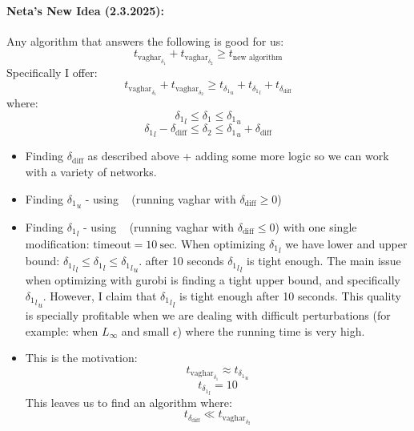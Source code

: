 \documentclass[11pt]{article}
\begin{document}
 \paragraph{Neta's New Idea (2.3.2025):}
 Any algorithm that answers the following is good for us:
 $$ t_{\text{vaghar}_{\delta_1}}+t_{\text{vaghar}_{\delta_2}} \geq t_\text{new algorithm}$$
 Specifically I offer:
  $$ t_{\text{vaghar}_{\delta_1}} + t_{\text{vaghar}_{\delta_2}} \geq t_{{\delta_1}_u} + t_{{\delta_1}_l} + t_{\delta_{\text{diff}}}$$
 where:
 $$ {{\delta_1}_l} \leq \delta_1 \leq {{\delta_1}_u} $$
  $$ {{\delta_1}_l}-{\delta_{\text{diff}}} \leq \delta_2 \leq {{\delta_1}_u}+{\delta_{\text{diff}}} $$
 
 \begin{itemize}
  \item Finding $\delta_{\text{diff}}$ as described above + adding some more logic so we can work with a variety of networks.
  \item Finding ${{\delta_1}_u}$ - using ~ (running vaghar with $\delta_{\text{diff}} \geq 0$)
  \item Finding ${{\delta_1}_l}$ - using ~ (running vaghar with $\delta_{\text{diff}} \leq 0$) with one single modification: ${\text{timeout}}=10\ \text{sec}$. When optimizing ${{\delta_1}_l}$ we have lower and upper bound: ${{\delta_1}_l}_l \leq {{\delta_1}_l} \leq {{\delta_1}_l}_u$. after 10 seconds ${{\delta_1}_l}_l$ is tight enough. The main issue when optimizing with gurobi is finding a tight upper bound, and specifically ${{\delta_1}_l}_u$. However, I claim that ${{\delta_1}_l}_l$ is tight enough after 10 seconds. This quality is specially profitable when we are dealing with difficult perturbations (for example: when $L_\infty$ and small $\epsilon$) where the running time is very high.
  \item This is the motivation:
  $$ t_{\text{vaghar}_{\delta_1}} \approx t_{{\delta_1}_u} $$
  $$ t_{{\delta_1}_l} = 10$$ 
  This leaves us to find an algorithm where:
  $$t_{\delta_{\text{diff}}} \ll t_{\text{vaghar}_{\delta_2}} $$
 \end{itemize}
 
\end{document}
